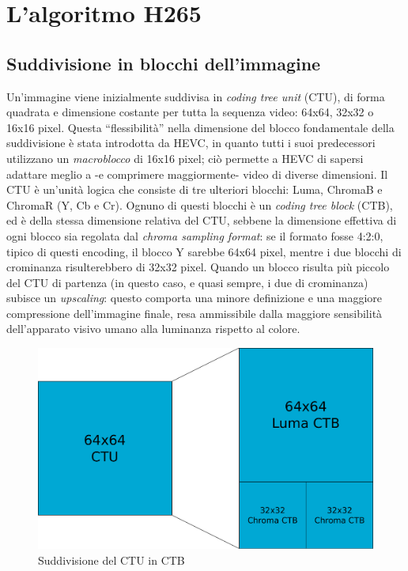 
\chapter{L'algoritmo H265} %

\label{Chapter4} %



\section{Suddivisione in blocchi dell'immagine} 
Un'immagine viene inizialmente suddivisa in \emph{coding tree unit} (CTU), di 
forma quadrata e dimensione costante per tutta la sequenza video: 64x64, 32x32 
o 16x16 pixel. Questa ``flessibilità'' nella dimensione del blocco fondamentale 
della suddivisione è stata introdotta da HEVC, in quanto tutti i suoi 
predecessori utilizzano un \emph{macroblocco} di 16x16 pixel; ciò permette a 
HEVC di sapersi adattare meglio a -e comprimere maggiormente- video di diverse 
dimensioni.
Il CTU è un'unità logica che consiste di tre ulteriori blocchi: Luma, 
ChromaB e ChromaR (Y, Cb e Cr). Ognuno di questi blocchi è un 
\emph{coding tree block} (CTB), ed è della stessa dimensione relativa 
del CTU, sebbene la dimensione effettiva di ogni blocco sia regolata dal 
\emph{chroma sampling format}: se il formato fosse 4:2:0, tipico di questi 
encoding, il blocco Y sarebbe 64x64 pixel, mentre i due blocchi di crominanza 
risulterebbero di 32x32 pixel. Quando un blocco risulta più piccolo del 
CTU di partenza (in questo caso, e quasi sempre, i due di crominanza) 
subisce un \emph{upscaling}: questo comporta una minore definizione e una 
maggiore compressione dell'immagine finale, resa ammissibile dalla maggiore 
sensibilità dell'apparato visivo umano alla luminanza rispetto al colore.
\begin{figure}[H]
  \centering
    \includegraphics[scale=0.20]{Figures/CTU-CTB}
  \caption{Suddivisione del CTU in CTB}
\end{figure}
